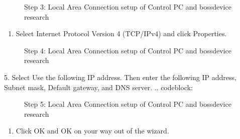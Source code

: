 \documentclass[letterpaper,10pt,english]{sphinxmanual}
\begin{document}
\begin{figure}[htbp]
\centering
\capstart

\noindent{}
\caption{Step 3: Local Area Connection setup of Control PC and bossdevice research}\label{\detokenize{2_setup_bossdevice_research:id2}}\end{figure}
\begin{enumerate}
%
\setcounter{enumi}{3}
\item {} 
Select Internet Protocol Version 4 (TCP/IPv4) and click Properties.

\end{enumerate}

\begin{figure}[htbp]
\centering
\capstart

\noindent{}
\caption{Step 4: Local Area Connection setup of Control PC and bossdevice research}\label{\detokenize{2_setup_bossdevice_research:id3}}\end{figure}

5. Select Use the following IP address. Then enter the following IP address, Subnet mask, Default gateway, and DNS server.
.. code\sphinxhyphen{}block:

\begin{sphinxVerbatim}[commandchars=\\\{\}]
           
          
      
           
\end{sphinxVerbatim}

\begin{figure}[htbp]
\centering
\capstart

\noindent{}
\caption{Step 5: Local Area Connection setup of Control PC and bossdevice research}\label{\detokenize{2_setup_bossdevice_research:id4}}\end{figure}
\begin{enumerate}
%
\setcounter{enumi}{5}
\item {} 
Click OK and OK on your way out of the wizard.

\end{enumerate}
\end{document}
